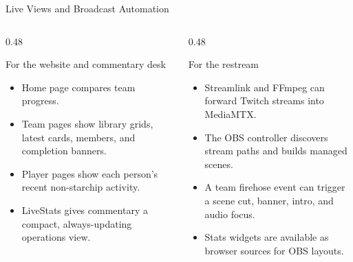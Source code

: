 \documentclass[aspectratio=169,11pt]{beamer}
\begin{document}
\begin{frame}{Live Views and Broadcast Automation}
  \begin{columns}[T,onlytextwidth]
    \begin{column}{0.48\textwidth}
      \begin{block}{For the website and commentary desk}
        \begin{itemize}
          \item Home page compares team progress.
          \item Team pages show library grids, latest cards, members, and completion banners.
          \item Player pages show each person's recent non-starchip activity.
          \item LiveStats gives commentary a compact, always-updating operations view.
        \end{itemize}
      \end{block}
    \end{column}
    \begin{column}{0.48\textwidth}
      \begin{block}{For the restream}
        \begin{itemize}
          \item Streamlink and FFmpeg can forward Twitch streams into MediaMTX.
          \item The OBS controller discovers stream paths and builds managed scenes.
          \item A team firehose event can trigger a scene cut, banner, intro, and audio focus.
          \item Stats widgets are available as browser sources for OBS layouts.
        \end{itemize}
      \end{block}
    \end{column}
  \end{columns}
\end{frame}
\end{document}
